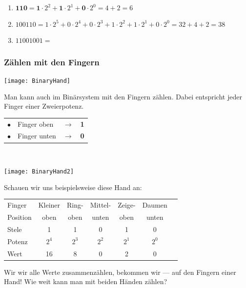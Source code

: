 \begin{example}\hfill
    \begin{enumerate}
        \item $\textbf{110} = \textbf{1} \cdot 2^2 + \textbf{1} \cdot 2^1 + \textbf{0} \cdot 2^0 = 4 + 2 = 6$
        \item $100110 = 1 \cdot 2^5 + 0 \cdot 2^4 + 0 \cdot 2^3 + 1 \cdot 2^2 + 1 \cdot 2^1 + 0 \cdot 2^0 = 32 + 4 + 2 = 38$
        \item $11001001 = $
    \end{enumerate}
\end{example}


\subsubsection*{Zählen mit den Fingern}

\begin{minipage}{.5\textwidth}
\texttt{[image: BinaryHand]}
\end{minipage}
\hspace*{.1\textwidth}
\begin{minipage}{.4\textwidth}
Man kann auch im Binärsystem mit den Fingern zählen. Dabei entspricht jeder Finger einer Zweierpotenz.
    \begin{tabular}{clcl}
        $\bullet$ & Finger oben & $\longrightarrow$ & \textbf{1} \\
        $\bullet$ & Finger unten & $\longrightarrow$ & \textbf{0}
    \end{tabular}
\end{minipage}

\begin{example} $ $ \\
\begin{minipage}{.3\textwidth}
\texttt{[image: BinaryHand2]}
\end{minipage}
\hspace*{.1\textwidth}
\begin{minipage}{.6\textwidth}
Schauen wir uns beispielsweise diese Hand an:

\hspace{.5cm}

    \begin{tabular}{lcccccl}
        Finger & Kleiner & Ring- & Mittel- & Zeige- & Daumen \\
        Position & oben & oben & unten & oben & unten \\
        Stele & 1 & 1 & 0 & 1 & 0 \\
        Potenz & $2^4$ & $2^3$ & $2^2$ & $2^1$ & $2^0$ \\
        Wert & 16 & 8 & 0 & 2 & 0 \\
    \end{tabular}

\hspace{.5cm}

Wir wir alle Werte zusammenzählen, bekommen wir --- auf den Fingern einer Hand! Wie weit kann man mit beiden Händen zählen?
\end{minipage}

\end{example}


